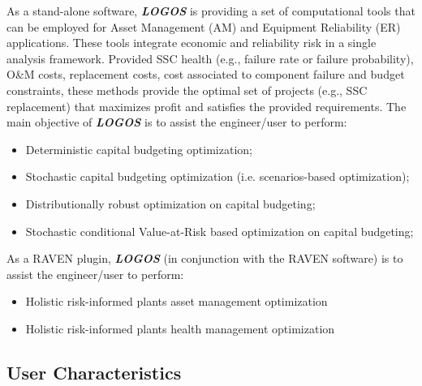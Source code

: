 As a stand-alone software, \textbf{\textit{LOGOS}} is providing a set of computational tools that can be
employed for Asset Management (AM) and Equipment Reliability (ER) applications.
These tools integrate economic and reliability risk in a single analysis framework.
Provided SSC health (e.g., failure rate or failure probability), O\&M costs,
replacement costs, cost associated to component failure and budget constraints,
these methods provide the optimal set of projects (e.g., SSC replacement) that
maximizes profit and satisfies the provided requirements. The main objective of
\textbf{\textit{LOGOS}} is to assist the engineer/user to perform:

\begin{itemize}
  \item Deterministic capital budgeting optimization;
  \item Stochastic capital budgeting optimization (i.e. scenarios-based optimization);
  \item Distributionally robust optimization on capital budgeting;
  \item Stochastic conditional Value-at-Risk based optimization on capital budgeting;
\end{itemize}

As a RAVEN plugin, \textbf{\textit{LOGOS}} (in conjunction with the RAVEN software)
is to assist the engineer/user to perform:
\begin{itemize}
  \item Holistic risk-informed plants asset management optimization
  \item Holistic risk-informed plants health management optimization
\end{itemize}

\subsection{User Characteristics}

